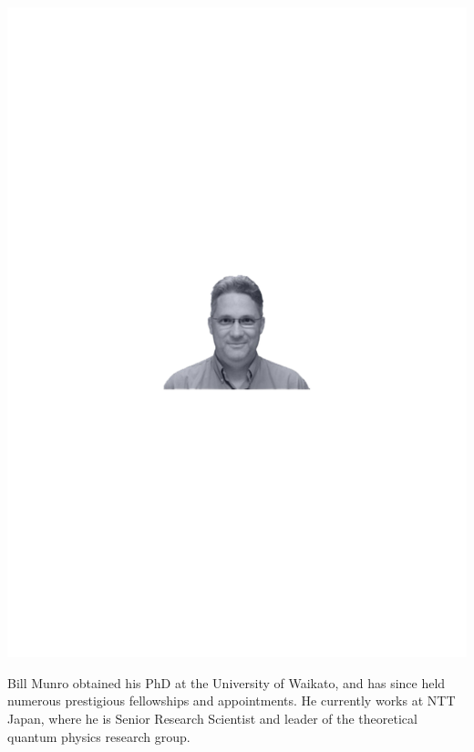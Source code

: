 \documentclass[aps,prl,twocolumn,amsmath,amssymb,nofootinbib,superscriptaddress]{revtex4}
\begin{document}
\includegraphics[width=\columnwidth]{photo_bill_munro}

Bill Munro obtained his PhD at the University of Waikato, and has since held numerous prestigious fellowships and appointments. He currently works at NTT Japan, where he is Senior Research Scientist and leader of the theoretical quantum physics research group.
\end{document}
